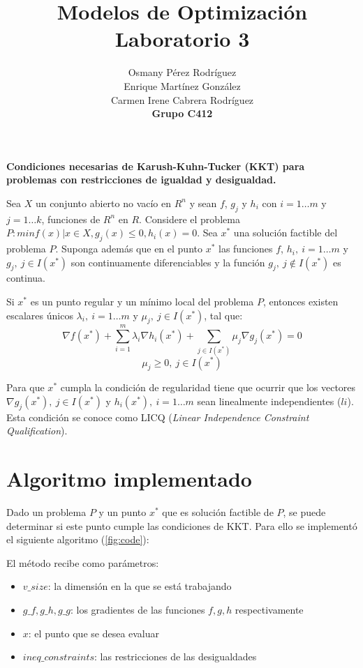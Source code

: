 \documentclass[titlepage, 11pt]{scrartcl}
\title{
    \normalfont\normalsize
    {\huge Modelos de Optimización\\
    		\textbf{Laboratorio 3}}
    \vspace{12pt}
}
\author{Osmany P\'erez Rodr\'iguez\\
		Enrique Mart\'inez Gonz\'alez\\
		Carmen Irene Cabrera Rodr\'iguez\\
		\textbf{Grupo C412}}
\date{}
\begin{document}
    \maketitle 
    
	\textbf{Condiciones necesarias de Karush-Kuhn-Tucker (KKT) para problemas con restricciones de igualdad y desigualdad.}
	
	Sea $X$ un conjunto abierto no vacío en $R^n$ y sean $f$, $g_j$ y $h_i$ con $i = 1 \ldots m$ y $j = 1\ldots k$, funciones de $R^n$ en $R$. Considere el problema $P: min{f(x) | x \in X, g_j(x) \leq 0, h_i(x) = 0}$. Sea $x^*$ una solución factible del problema $P$. Suponga además que en el punto $x^*$ las funciones $f$, $h_i , \ i = 1 \ldots m$ y $g_j, \ j \in I(x^*)$ son continuamente diferenciables y la función $g_j, \ j\notin I(x^*)$ es continua.
	
	Si $x^*$ es un punto regular y un mínimo local del problema $P$, entonces existen escalares únicos $\lambda_i, \ i = 1 \ldots m$ y $\mu_j, \ j \in I(x^*)$, tal que:
	\begin{equation*}
		\nabla f(x^*) + \sum_{i = 1}^{m}\lambda_i \nabla h_i(x^*) + \sum_{j \in I(x^*)}\mu_j \nabla g_j(x^*) = 0
	\end{equation*}
	\begin{equation*}
		\mu_j \geq 0, \ j \in I(x^*)
	\end{equation*}
	
	\vspace{5mm}
	Para que $x^*$ cumpla la condici\'on de regularidad tiene que ocurrir que los vectores $\nabla g_j(x^*), \ j \in I(x^*)$ y $h_i(x^*), \ i = 1 \ldots m$ sean linealmente independientes ($li$). Esta condici\'on se conoce como LICQ (\textit{Linear Independence Constraint Qualification}).
	\vspace{1cm}
	\section{Algoritmo implementado}
	
	Dado un problema $P$ y un punto $x^*$ que es solución factible de $P$, se puede determinar si este punto cumple las condiciones de KKT. Para ello se implement\'o el siguiente algoritmo (\ref{fig:code}):
	
	El método recibe como parámetros:
	\begin{itemize}
		\item $v\_size$: la dimensión en la que se está trabajando
		\item $g\_f, g\_h, g\_g$: los gradientes de las funciones $f, g, h$ respectivamente
		\item $x$: el punto que se desea evaluar
		\item $ineq\_constraints$: las restricciones de las desigualdades
	\end{itemize}
	
\end{document}
